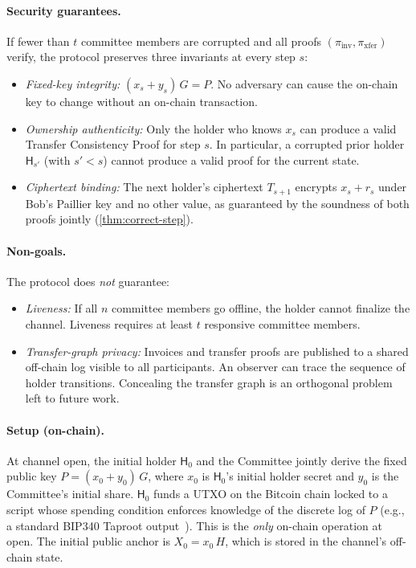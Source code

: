 \paragraph{Security guarantees.}
If fewer than $t$ committee members are corrupted and all proofs $(\pi_{\mathrm{inv}}, \pi_{\mathrm{xfer}})$ verify, the protocol preserves three invariants at every step $s$:
\begin{itemize}
  \item \emph{Fixed-key integrity:} $(x_s + y_s)\,G = P$. No adversary can cause the on-chain key to change without an on-chain transaction.
  \item \emph{Ownership authenticity:} Only the holder who knows $x_s$ can produce a valid Transfer Consistency Proof for step $s$. In particular, a corrupted prior holder $\mathsf{H}_{s'}$ (with $s' < s$) cannot produce a valid proof for the current state.
  \item \emph{Ciphertext binding:} The next holder's ciphertext $T_{s+1}$ encrypts $x_s + r_s$ under Bob's Paillier key and no other value, as guaranteed by the soundness of both proofs jointly (\autoref{thm:correct-step}).
\end{itemize}

\paragraph{Non-goals.}
The protocol does \emph{not} guarantee:
\begin{itemize}
  \item \emph{Liveness:} If all $n$ committee members go offline, the holder cannot finalize the channel. Liveness requires at least $t$ responsive committee members.
  \item \emph{Transfer-graph privacy:} Invoices and transfer proofs are published to a shared off-chain log visible to all participants. An observer can trace the sequence of holder transitions. Concealing the transfer graph is an orthogonal problem left to future work.
\end{itemize}

\paragraph{Setup (on-chain).} At channel open, the initial holder $\mathsf{H}_0$ and the Committee jointly derive the fixed public key $P = (x_0 + y_0)\,G$, where $x_0$ is $\mathsf{H}_0$'s initial holder secret and $y_0$ is the Committee's initial share. $\mathsf{H}_0$ funds a UTXO on the Bitcoin chain locked to a script whose spending condition enforces knowledge of the discrete log of $P$ (e.g., a standard BIP340 Taproot output~\cite{bip340}). This is the \emph{only} on-chain operation at open. The initial public anchor is $X_0 = x_0\,H$, which is stored in the channel's off-chain state.

